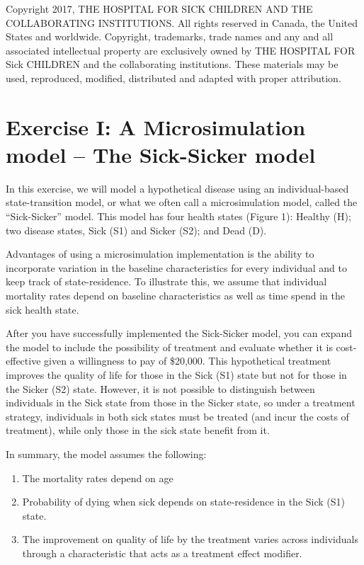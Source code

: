 \documentclass[
]{article}
\begin{document}
Copyright 2017, THE HOSPITAL FOR SICK CHILDREN AND THE COLLABORATING
INSTITUTIONS. All rights reserved in Canada, the United States and
worldwide. Copyright, trademarks, trade names and any and all associated
intellectual property are exclusively owned by THE HOSPITAL FOR Sick
CHILDREN and the collaborating institutions. These materials may be
used, reproduced, modified, distributed and adapted with proper
attribution.

\hypertarget{exercise-i-a-microsimulation-model-the-sick-sicker-model}{%
\section{Exercise I: A Microsimulation model -- The Sick-Sicker
model}\label{exercise-i-a-microsimulation-model-the-sick-sicker-model}}

In this exercise, we will model a hypothetical disease using an
individual-based state-transition model, or what we often call a
microsimulation model, called the ``Sick-Sicker'' model. This model has
four health states (Figure 1): Healthy (H); two disease states, Sick
(S1) and Sicker (S2); and Dead (D).

Advantages of using a microsimulation implementation is the ability to
incorporate variation in the baseline characteristics for every
individual and to keep track of state-residence. To illustrate this, we
assume that individual mortality rates depend on baseline
characteristics as well as time spend in the sick health state.

After you have successfully implemented the Sick-Sicker model, you can
expand the model to include the possibility of treatment and evaluate
whether it is cost-effective given a willingness to pay of \$20,000.
This hypothetical treatment improves the quality of life for those in
the Sick (S1) state but not for those in the Sicker (S2) state. However,
it is not possible to distinguish between individuals in the Sick state
from those in the Sicker state, so under a treatment strategy,
individuals in both sick states must be treated (and incur the costs of
treatment), while only those in the sick state benefit from it.

In summary, the model assumes the following:

\begin{enumerate}
\def\labelenumi{\roman{enumi})}
\item
  The mortality rates depend on age
\item
  Probability of dying when sick depends on state-residence in the Sick
  (S1) state.
\item
  The improvement on quality of life by the treatment varies across
  individuals through a characteristic that acts as a treatment effect
  modifier.
\end{enumerate}
\end{document}
